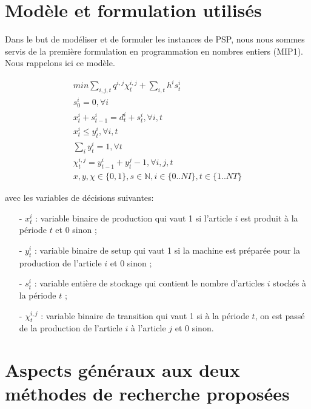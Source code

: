 	\section{Modèle et formulation utilisés}
	Dans le but de modéliser et de formuler les instances de PSP, nous nous sommes servis de la première formulation en programmation en nombres entiers (MIP1). Nous rappelons ici ce modèle. 
	
	\begin{eqnarray}
		min \sum_{i,j,t} q^{i,j}\chi_{t}^{i,j} + \sum_{i,t} h^{i} s_{t}^{i} \\
		s_{0}^{i} = 0, \forall i \\
		x_{t}^{i} + s_{t-1}^{i} = d_{t}^{i} + s_{t}^{i}, \forall i,t \\
		x_{t}^{i} \leq y_{t}^{i}, \forall i,t \\
		\sum_{i} y_{t}^{i} = 1 , \forall t \\
		\chi_{t}^{i,j} = y_{t-1}^{i} + y_{t}^{j} - 1, \forall i,j,t \\
		x,y,\chi \in \{0,1\}, s \in \mathbb{N}, i \in \{0..NI\}, t \in \{1..NT\}
	\end{eqnarray}
		
		avec les variables de décisions suivantes: \\
		\begin{itemize}
			\item[-] $x_{t}^{i}$ : variable binaire de production qui vaut 1 si l’article $i$ est produit à la période $t$ et 0 sinon ;
			\item[-] $y_{t}^{i}$ : variable binaire de setup qui vaut 1 si la machine est préparée pour la production de l’article $i$ et 0 sinon ;
			\item[-] $s_{t}^{i}$ : variable entière de stockage qui contient le nombre d’articles $i$ stockés à la période $t$ ; 
			\item[-] $\chi_{t}^{i,j}$ : variable binaire de transition qui vaut 1 si à la période $t$, on est passé de la production de l’article $i$ à l’article $j$ et 0 sinon.
		\end{itemize}
	
	\section{Aspects généraux aux deux méthodes de recherche proposées}

